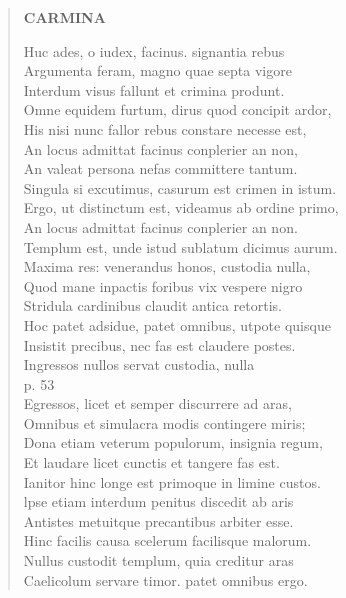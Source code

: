 \documentclass[11pt, a4paper]{report}
\begin{document}
\begin{verse}
    \begin{center} \textbf{CARMINA} \end{center} \marginpar{[90]} Huc ades,  \lbrack o \rbrack  iudex, facinus. signantia rebus \\ Argumenta feram, magno quae septa vigore \\ Interdum visus fallunt et crimina produnt. \\ Omne equidem furtum, dirus quod concipit ardor, \\ His nisi nunc fallor rebus constare necesse est, \\ An locus admittat facinus conplerier an non, \\ An valeat persona nefas committere tantum. \\ Singula si excutimus, casurum est crimen in istum. \\ Ergo, ut distinctum est, videamus ab ordine primo, \\ An locus admittat facinus conplerier an non. \\ Templum est, unde istud sublatum dicimus aurum. \\ Maxima res: venerandus honos, custodia nulla, \\ Quod mane inpactis foribus vix vespere nigro \\ Stridula cardinibus claudit antica retortis. \\ Hoc patet adsidue, patet omnibus, utpote quisque \\ Insistit precibus, nec fas est claudere postes. \\ Ingressos nullos servat custodia, nulla \\ p. 53 \\ Egressos, licet  \lbrack et \rbrack  semper discurrere ad aras, \\ Omnibus et simulacra modis contingere miris; \\ Dona etiam veterum populorum, insignia regum, \\ Et laudare licet cunctis et tangere fas est. \\ Ianitor hinc longe est primoque in limine custos. \\ lpse etiam interdum penitus discedit ab aris \\ Antistes metuitque precantibus arbiter esse. \\ Hinc facilis causa scelerum facilisque malorum. \\ Nullus custodit templum, quia creditur aras \\ Caelicolum servare timor. patet omnibus ergo. \\ 

\end{verse}
\end{document}
